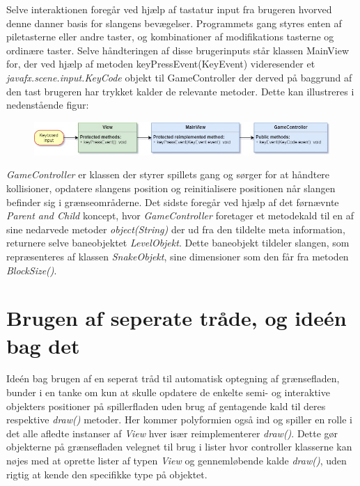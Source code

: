 \documentclass[]{article}
\begin{document}
Selve interaktionen foregår ved hjælp af tastatur input fra brugeren hvorved denne danner basis for slangens bevægelser. Programmets gang styres enten af piletasterne eller andre taster, og kombinationer af modifikations tasterne og ordinære taster. Selve håndteringen af disse brugerinputs står klassen MainView for, der ved hjælp af metoden keyPressEvent(KeyEvent) videresender et \textit{javafx.scene.input.KeyCode}  objekt til GameController der derved på baggrund af den tast brugeren har trykket kalder de relevante metoder. Dette kan illustreres i nedenstående figur:


\begin{figure}[h!]
	\centering
	\includegraphics[width=\linewidth]{Event_sequence.jpg}
	\label{fig:Event}
\end{figure}

\textit{GameController} er klassen der styrer spillets gang og sørger for at håndtere kollisioner, opdatere slangens position og reinitialisere positionen når slangen befinder sig i grænseområderne. Det sidste foregår ved hjælp af det førnævnte \textit{Parent and Child} koncept, hvor \textit{GameController} foretager et metodekald til en af sine nedarvede metoder \textit{object(String)} der ud fra den tildelte meta information, returnere selve baneobjektet \textit{LevelObjekt}. Dette baneobjekt tildeler slangen, som repræsenteres af klassen \textit{SnakeObjekt}, sine dimensioner som den får fra metoden \textit{BlockSize()}.\\

\section{Brugen af seperate tråde, og ideén bag det}

Ideén bag brugen af en seperat tråd til automatisk optegning af grænsefladen, bunder i en tanke om kun at skulle opdatere de enkelte semi- og interaktive objekters positioner på spillerfladen uden brug af gentagende kald til deres respektive \textit{draw()} metoder. Her kommer polyformien også ind og spiller en rolle i det alle afledte instanser af \textit{View} hver især reimplementerer \textit{draw()}. Dette gør objekterne på grænsefladen velegnet til brug i lister hvor controller klasserne kan nøjes med at oprette lister af typen \textit{View} og gennemløbende kalde \textit{draw()}, uden rigtig at kende den specifikke type på objektet. 
\end{document}
